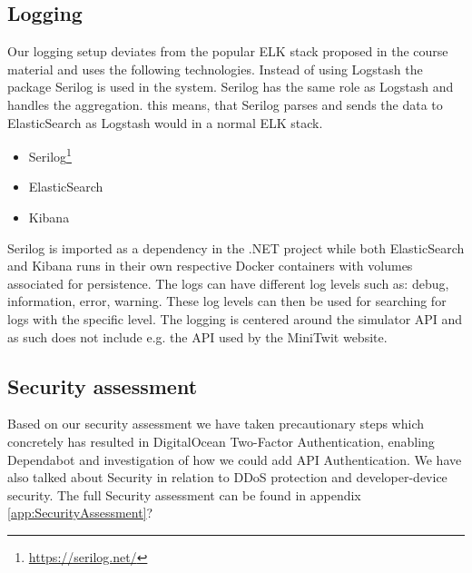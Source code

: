 \subsection{Logging}
Our logging setup deviates from the popular ELK stack proposed in the course material and uses the following technologies. Instead of using Logstash the package Serilog is used in the system. Serilog has the same role as Logstash and handles the aggregation. this means, that Serilog parses and sends the data to ElasticSearch as Logstash would in a normal ELK stack.
\begin{itemize}
    \item Serilog\footnote{\url{https://serilog.net/}}
    \item ElasticSearch
    \item Kibana 
\end{itemize}
Serilog is imported as a dependency in the .NET project while both ElasticSearch and Kibana runs in their own respective Docker containers with volumes associated for persistence. The logs can have different log levels such as: debug, information, error, warning. These log levels can then be used for searching for logs with the specific level.
The logging is centered around the simulator API and as such does not include e.g. the API used by the MiniTwit website.\\ 





\subsection{Security assessment}
Based on our security assessment we have taken precautionary steps which concretely has resulted in DigitalOcean Two-Factor Authentication, enabling Dependabot and investigation of how we could add API Authentication. We have also talked about Security in relation to DDoS protection and developer-device security. The full Security assessment can be found in appendix \ref{app:SecurityAssessment}?

